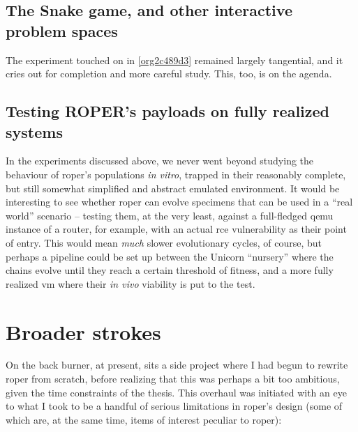 \documentclass[12pt,glossary]{dalthesis}
\begin{document}
\subsection{The Snake game, and other interactive problem spaces}
\label{sec:org4c050b7}

The experiment touched on in \ref{org2c489d3} remained largely tangential,
and it cries out for completion and more careful study. This, too, is on the agenda. 

\subsection{Testing ROPER's payloads on fully realized systems}
\label{sec:org2a6d220}

In the experiments discussed above, we never went beyond studying the behaviour
of \gls{roper}'s populations \emph{in vitro}, trapped in their reasonably complete, but
still somewhat simplified and abstract emulated environment. It would be interesting
to see whether \gls{roper} can evolve specimens that can be used in a ``real world''
scenario -- testing them, at the very least, against a full-fledged \gls{qemu} instance
of a router, for example, with an actual \gls{rce} vulnerability as their point of
entry. This would mean \emph{much} slower evolutionary cycles, of course, but perhaps
a pipeline could be set up between the Unicorn ``nursery'' where the chains evolve 
until they reach a certain threshold of fitness, and a more fully realized \gls{vm}
where their \emph{in vivo} viability is put to the test. 


\section{Broader strokes}
\label{sec:orga5b2803}

On the back burner, at present, sits a side project where I had begun to rewrite
\gls{roper} from scratch, before realizing that this was perhaps a bit too
ambitious, given the time constraints of the thesis. This overhaul was initiated
with an eye to what I took to be a handful of serious limitations in \gls{roper}'s
design (some of which are, at the same time, items of interest peculiar to \gls{roper}):
\end{document}
